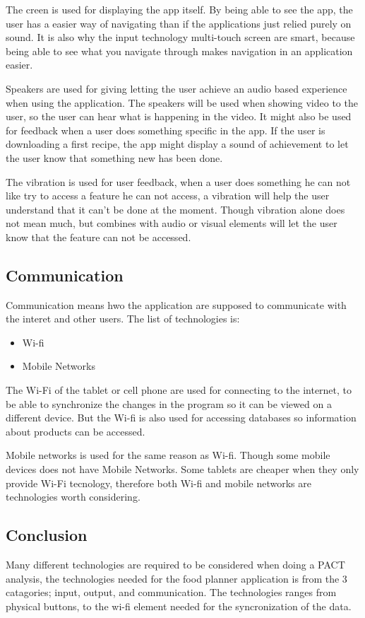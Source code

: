 The creen is used for displaying the app itself. By being able to see the app, the user has a easier way of navigating than if the applications just relied purely on sound. It is also why the input technology multi-touch screen are smart, because being able to see what you navigate through makes navigation in an application easier.

Speakers are used for giving letting the user achieve an audio based experience when using the application. The speakers will be used when showing video to the user, so the user can hear what is happening in the video. It might also be used for feedback when a user does something specific in the app. If the user is downloading a first recipe, the app might display a sound of achievement to let the user know that something new has been done.

The vibration is used for user feedback, when a user does something he can not like try to access a feature he can not access, a vibration will help the user understand that it can't be done at the moment. Though vibration alone does not mean much, but combines with audio or visual elements will let the user know that the feature can not be accessed.

\subsection{Communication}

Communication means hwo the application are supposed to communicate with the interet and other users. The list of technologies is:

\begin{itemize}
    \item Wi-fi
    \item Mobile Networks
\end{itemize}

The Wi-Fi of the tablet or cell phone are used for connecting to the internet, to be able to synchronize the changes in the program so it can be viewed on a different device. But the Wi-fi is also used for accessing databases so information about products can be accessed.

Mobile networks is used for the same reason as Wi-fi. Though some mobile devices does not have Mobile Networks. Some tablets are cheaper when they only provide Wi-Fi tecnology, therefore both Wi-fi and mobile networks are technologies worth considering.

\subsection{Conclusion}

Many different technologies are required to be considered when doing a PACT analysis, the technologies needed for the food planner application is from the 3 catagories; input, output, and communication. The technologies ranges from physical buttons, to the wi-fi element needed for the syncronization of the data.
